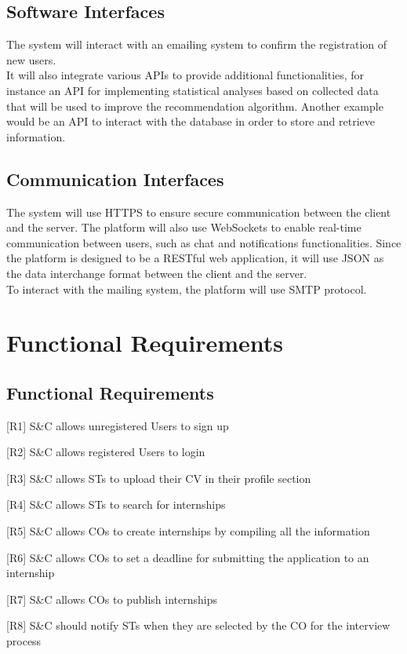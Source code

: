 \subsection{Software Interfaces}
The system will interact with an emailing system to confirm the registration of new users. \\
It will also integrate various APIs to provide additional functionalities, for instance an API for implementing statistical analyses 
based on collected data that will be used to improve the recommendation algorithm. Another example would be an API to interact with
the database in order to store and retrieve information.


\subsection{Communication Interfaces}
The system will use HTTPS to ensure secure communication between the client and the server. The platform will also use WebSockets to
enable real-time communication between users, such as chat and notifications functionalities. Since the platform is designed to be a 
RESTful web application, it will use JSON as the data interchange format between the client and the server. \\
To interact with the mailing system, the platform will use SMTP protocol.


\section{Functional Requirements}
\subsection{Functional Requirements}
[R1] S\&C allows unregistered Users to sign up

[R2] S\&C allows registered Users to login	

[R3] S\&C allows STs to upload their CV in their profile section

[R4] S\&C allows STs to search for internships

[R5] S\&C allows COs to create internships by compiling all the information

[R6] S\&C allows COs to set a deadline for submitting the application to an internship

[R7] S\&C allows COs to publish internships

[R8] S\&C should notify STs when they are selected by the CO for the interview process

